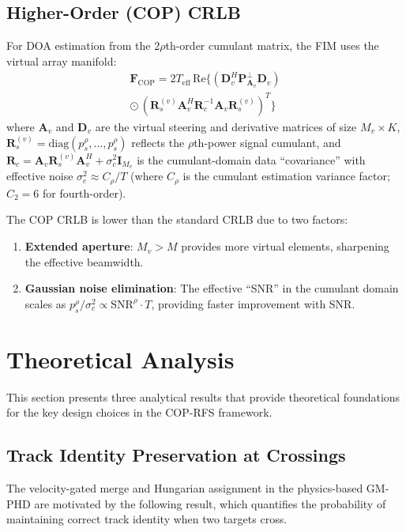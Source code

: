 \documentclass[journal]{IEEEtran}
\newcommand{\mat}[1]{\mathbf{#1}}
\newcommand{\diag}{\mathrm{diag}}
\newcommand{\Real}{\mathrm{Re}}
\begin{document}
\subsection{Higher-Order (COP) CRLB}

For DOA estimation from the $2\rho$th-order cumulant matrix, the FIM uses the virtual array manifold:
\begin{multline}
\mat{F}_{\mathrm{COP}} = 2T_{\mathrm{eff}}\,\Real\!\big\{(\mat{D}_v^H\mat{P}_{\mat{A}_v}^\perp\mat{D}_v) \\
\odot\, (\mat{R}_s^{(v)}\mat{A}_v^H\mat{R}_c^{-1}\mat{A}_v\mat{R}_s^{(v)})^T\big\}
\label{eq:fim_cop}
\end{multline}
where $\mat{A}_v$ and $\mat{D}_v$ are the virtual steering and derivative matrices of size $M_v \times K$, $\mat{R}_s^{(v)} = \diag(p_s^\rho, \ldots, p_s^\rho)$ reflects the $\rho$th-power signal cumulant, and $\mat{R}_c = \mat{A}_v\mat{R}_s^{(v)}\mat{A}_v^H + \sigma_c^2\mat{I}_{M_v}$ is the cumulant-domain data ``covariance'' with effective noise $\sigma_c^2 \approx C_\rho / T$ (where $C_\rho$ is the cumulant estimation variance factor; $C_2 = 6$ for fourth-order).

The COP CRLB is lower than the standard CRLB due to two factors:
\begin{enumerate}
\item \textbf{Extended aperture}: $M_v > M$ provides more virtual elements, sharpening the effective beamwidth.
\item \textbf{Gaussian noise elimination}: The effective ``SNR'' in the cumulant domain scales as $p_s^\rho / \sigma_c^2 \propto \mathrm{SNR}^\rho \cdot T$, providing faster improvement with SNR.
\end{enumerate}

\section{Theoretical Analysis}
\label{sec:theory}

This section presents three analytical results that provide theoretical foundations for the key design choices in the COP-RFS framework.

\subsection{Track Identity Preservation at Crossings}
\label{sec:tipp}

The velocity-gated merge and Hungarian assignment in the physics-based GM-PHD are motivated by the following result, which quantifies the probability of maintaining correct track identity when two targets cross.
\end{document}
